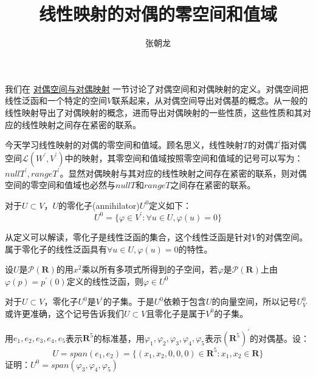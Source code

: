 \documentclass[10pt,a4paper,UTF8]{article}
\author{张朝龙}
\date{}
\title{线性映射的对偶的零空间和值域}
\begin{document}
\maketitle
我们在 \href{duality.org}{对偶空间与对偶映射} 一节讨论了对偶空间和对偶映射的定义。对偶空间把线性泛函和一个特定的空间\(V\)联系起来，从对偶空间导出对偶基的概念。从一般的线性映射导出了对偶映射的概念，进而导出对偶映射的一些性质，这些性质和其对应的线性映射之间存在紧密的联系。

今天学习线性映射的对偶的零空间和值域。顾名思义，线性映射\(T\)的对偶\(T^{'}\)指对偶空间\(\mathcal{L}(W^{'},V^{'})\)中的映射，其零空间和值域按照零空间和值域的记号可以写为：\(nullT^{'},rangeT^{'}\)。显然对偶映射与其对应的线性映射之间存在紧密的联系，则对偶空间的零空间和值域也必然与\(nullT\)和\(rangeT\)之间存在紧密的联系。

\begin{definition}
对于\(U\subset V\)，\(U\)的零化子(annihilator)\(U^{0}\)定义如下：\[U^{0} = \{\varphi\in V^{'}: \forall u\in U, \varphi(u) = 0\}\]
\end{definition}

从定义可以解读，零化子是线性泛函的集合，这个线性泛函是针对\(V\)的对偶空间。属于零化子的线性泛函具有\(\forall u\in U,\varphi(u) = 0\)的特性。

\begin{instance}
设\(U\)是\(\mathcal{P}(\mathbf{R})\)的用\(x^{2}\)乘以所有多项式所得到的子空间，若\(\varphi\)是\(\mathcal{P}(\mathbf{R})\)上由\(\varphi(p) = p^{'}(0)\)定义的线性泛函，则\(\varphi\in U^{0}\)
\end{instance}

对于\(U\subset V\)，零化子\(U^{0}\)是\(V^{'}\)的子集。于是\(U^{0}\)依赖于包含\(U\)的向量空间，所以记号\(U_{V}^{0}\)或许更准确，这个记号告诉我们\(U\subset V\)且零化子是属于\(V^{0}\)的子集。

\begin{instance}
用\(e_{1},e_{2},e_{3},e_{4},e_{5}\)表示\(\mathbf{R}^{5}\)的标准基，用\(\varphi_{1},\varphi_{2},\varphi_{3},\varphi_{4},\varphi_{5}\)表示\((\mathbf{R}^{5})^{'}\)的对偶基。设：
\begin{equation}
\label{eq:8}
U = span(e_{1},e_{2}) = \{(x_{1},x_{2},0,0,0)\in \mathbf{R}^{5}:x_{1},x_{2}\in \mathbf{R}\}
\end{equation}
证明：\(U^{0}=span(\varphi_{3},\varphi_{4},\varphi_{5})\)
\end{instance}
\end{document}
